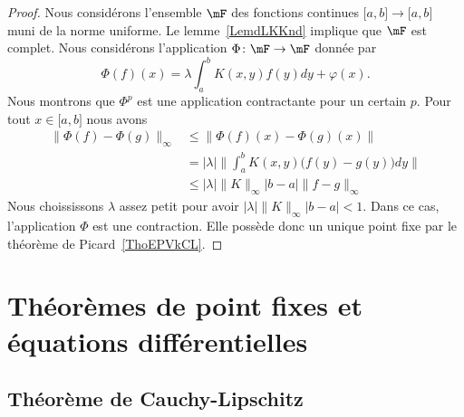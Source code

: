 \begin{proof}
	Nous considérons l'ensemble \( \mF\) des fonctions continues \( \mathopen[ a , b \mathclose]\to\mathopen[ a , b \mathclose]\) muni de la norme uniforme. Le lemme~\ref{LemdLKKnd} implique que \( \mF\) est complet. Nous considérons l'application \( \Phi\colon \mF\to \mF\) donnée par
	\begin{equation}
		\Phi(f)(x)=\lambda\int_a^bK(x,y)f(y)dy+\varphi(x).
	\end{equation}
	Nous montrons que \( \Phi^p\) est une application contractante pour un certain \( p\). Pour tout \( x\in \mathopen[ a , b \mathclose]\) nous avons
	\begin{subequations}
		\begin{align}
			\| \Phi(f)-\Phi(g) \|_{\infty} & \leq \| \Phi(f)(x)-\Phi(g)(x) \|                                    \\
			                               & =   | \lambda |\Big\| \int_a^bK(x,y)\big( f(y)-g(y) \big)dy  \Big\| \\
			                               & \leq  | \lambda |\| K \|_{\infty}| b-a |\| f-g \|_{\infty}
		\end{align}
	\end{subequations}
	Nous choississons \( \lambda\) assez petit pour avoir \( | \lambda |\| K \|_{\infty}| b-a |<1\). Dans ce cas, l'application \( \Phi\) est une contraction. Elle possède donc un unique point fixe par le théorème de Picard~\ref{ThoEPVkCL}.
\end{proof}

\section{Théorèmes de point fixes et équations différentielles}

\subsection{Théorème de Cauchy-Lipschitz}

